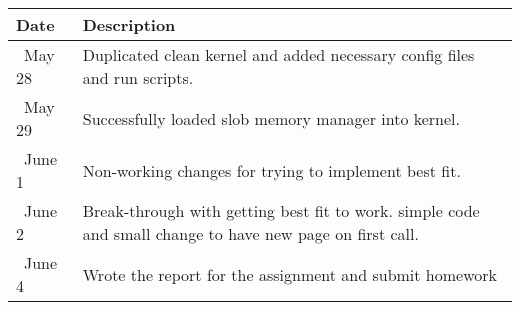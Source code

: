 \begin{tabular}{l l}\textbf{Date} & \textbf{Description}\\\hline
\ May 28 & Duplicated clean kernel and added necessary config files and run scripts.\\\hline
\ May 29 & Successfully loaded slob memory manager into kernel.\\\hline
\ June 1 & Non-working changes for trying to implement best fit.\\\hline
\ June 2 & Break-through with getting best fit to work. simple code and small change to have new page on first call.\\\hline
\ June 4 & Wrote the report for the assignment and submit homework\\\hline
\end{tabular}
